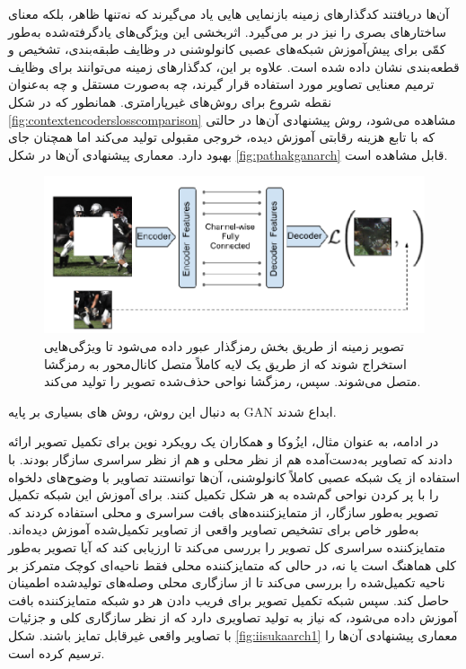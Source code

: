 آن‌ها دریافتند  کدگذارهای زمینه بازنمایی هایی یاد می‌گیرند که نه‌تنها ظاهر، بلکه معنای ساختارهای بصری را نیز در بر می‌گیرد. اثربخشی این ویژگی‌های یادگرفته‌شده به‌طور کمّی برای پیش‌آموزش شبکه‌های عصبی کانولوشنی در وظایف طبقه‌بندی، تشخیص و قطعه‌بندی نشان داده شده است. علاوه بر این، کدگذارهای زمینه می‌توانند برای وظایف ترمیم معنایی تصاویر مورد استفاده قرار گیرند، چه به‌صورت مستقل و چه به‌عنوان نقطه شروع برای روش‌های غیرپارامتری. همانطور که در شکل \ref{fig:contextencoderslosscomparison} مشاهده می‌شود، روش پیشنهادی آن‌ها در حالتی که با تابع هزینه رقابتی آموزش دیده، خروجی مقبولی تولید می‌کند اما همچنان جای بهبود دارد. معماری پیشنهادی آن‌ها در شکل \ref{fig:pathakganarch} قابل مشاهده است.
\begin{figure}
	\centering
	\includegraphics[width=0.7\linewidth]{figs/contextencodersArchitecture}
	\caption[معماری کلی Context Encoders]{
	تصویر زمینه از طریق بخش رمزگذار عبور داده می‌شود تا ویژگی‌هایی استخراج شوند که از طریق یک لایه کاملاً متصل کانال‌محور به رمزگشا متصل می‌شوند. سپس، رمزگشا نواحی حذف‌شده تصویر را تولید می‌کند.}
	\label{fig:contextencodersarchitecture}
\end{figure}

به دنبال این روش، روش های بسیاری بر پایه GAN ابداع شدند. 
\cite{caoLearningSketchTensor2021}
\cite{guoImageInpaintingConditional2024}
\cite{liRecurrentFeatureReasoning2020}
\cite{nazeriEdgeConnectGenerativeImage2019}
\cite{pengGeneratingDiverseStructure2021}

در ادامه، به عنوان مثال، ایزُوکا و همکاران یک رویکرد نوین برای تکمیل تصویر ارائه دادند
\cite{iizukaGloballyLocallyConsistent2017}
که تصاویر به‌دست‌آمده هم از نظر محلی و هم از نظر سراسری سازگار بودند. با استفاده از یک شبکه عصبی کاملاً کانولوشنی، آن‌ها توانستند تصاویر با وضوح‌های دلخواه را با پر کردن نواحی گم‌شده به هر شکل تکمیل کنند. برای آموزش این شبکه تکمیل تصویر به‌طور سازگار، از متمایزکننده‌های بافت سراسری و محلی استفاده کردند که به‌طور خاص برای تشخیص تصاویر واقعی از تصاویر تکمیل‌شده آموزش دیده‌اند. متمایزکننده سراسری کل تصویر را بررسی می‌کند تا ارزیابی کند که آیا تصویر به‌طور کلی هماهنگ است یا نه، در حالی که متمایزکننده محلی فقط ناحیه‌ای کوچک متمرکز بر ناحیه تکمیل‌شده را بررسی می‌کند تا از سازگاری محلی وصله‌های تولیدشده اطمینان حاصل کند. سپس شبکه تکمیل تصویر برای فریب دادن هر دو شبکه متمایزکننده بافت آموزش داده می‌شود، که نیاز به تولید تصاویری دارد که از نظر سازگاری کلی و جزئیات با تصاویر واقعی غیرقابل تمایز باشند. شکل \ref{fig:iisukaarch1} معماری پیشنهادی آن‌ها را ترسیم کرده است. 

